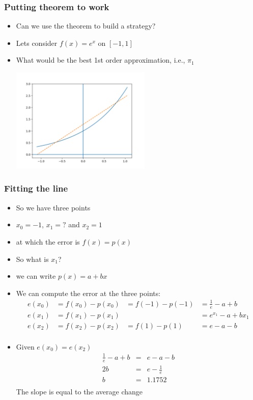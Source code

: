 \documentclass[10pt]{beamer}
\begin{document}
\begin{frame}
  \frametitle{Putting theorem to work}
  \begin{itemize}
  \item Can we use the theorem to build a strategy? 
  \item Lets consider $f(x) = e^x \mbox{ on } [-1, 1]$
  \item What would be the best 1st order approximation, i.e., $\pi_1$
    \centerline{\includegraphics[height=5cm]{figure_1}}
  \end{itemize}
\end{frame}

\begin{frame}
  \frametitle{Fitting the line}
  \begin{itemize}
  \item So we have three points
  \item $x_0 = -1$, $x_1 = ? $ and $x_2 = 1$ 
  \item at which the error is $f(x) = p(x)$
  \item So what  is $x_1$?
    \pause
  \item we can write $p(x) = a + b x$
  \item We can compute the error at the three points:
    \[
      \begin{array}{llll}
        e(x_0) & = f(x_0) - p(x_0) & = f(-1) - p(-1) & = \frac{1}{e} - a + b\\
        e(x_1) & = f(x_1) - p(x_1) &                 & = e^{x_1} - a + b x_1\\
        e(x_2) & = f(x_2) - p(x_2) & = f(1) - p(1)   & = e - a - b\\
      \end{array}
    \]  
  \item Given $e(x_0) = e(x_2)$
    \[
      \begin{array}{ccc}
        \frac{1}{e} - a + b & = & e - a - b\\
        2 b & = & e - \frac{1}{e} \\
        b   & = & 1.1752\\
      \end{array}
    \] The slope is equal to the average change
  \end{itemize}
\end{frame}
\end{document}
